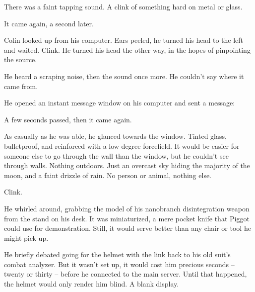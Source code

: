 
There was a faint tapping sound.  A clink of something hard on metal or glass.



It came again, a second later.



Colin looked up from his computer.  Ears peeled, he turned his head to the left and waited.  Clink.  He turned his head the other way, in the hopes of pinpointing the source.



He heard a scraping noise, then the sound once more.  He couldn't say where it came from.



He opened an instant message window on his computer and sent a message:





A few seconds passed, then it came again.


As casually as he was able, he glanced towards the window.  Tinted glass, bulletproof, and reinforced with a low degree forcefield.  It would be easier for someone else to go through the wall than the window, but he couldn't see through walls.  Nothing outdoors.  Just an overcast sky hiding the majority of the moon, and a faint drizzle of rain.  No person or animal, nothing else.



Clink.





He whirled around, grabbing the model of his nanobranch disintegration weapon from the stand on his desk.  It was miniaturized, a mere pocket knife that Piggot could use for demonstration.  Still, it would serve better than any chair or tool he might pick up.



He briefly debated going for the helmet with the link back to his old suit's combat analyzer.  But it wasn't set up, it would cost him precious seconds – twenty or thirty – before he connected to the main server.  Until that happened, the helmet would only render him blind.  A blank display.



